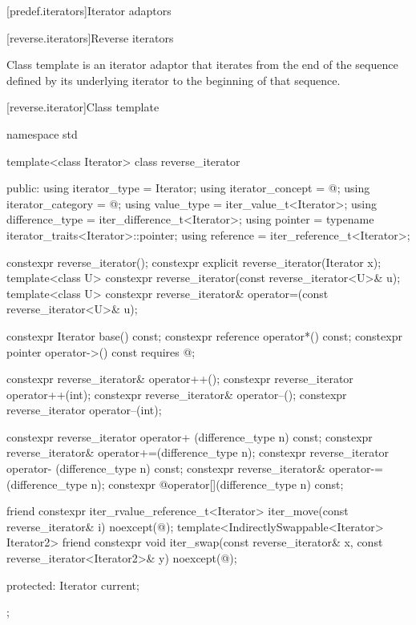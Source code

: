 [predef.iterators]{Iterator adaptors}

[reverse.iterators]{Reverse iterators}

\pnum
Class template  is an iterator adaptor that iterates from the end of the sequence defined by its underlying iterator to the beginning of that sequence.

[reverse.iterator]{Class template }

%
\begin{codeblock}
namespace std {
  template<class Iterator>
  class reverse_iterator {
  public:
    using iterator_type     = Iterator;
    using iterator_concept  = @\seebelow@;
    using iterator_category = @\seebelow@;
    using value_type        = iter_value_t<Iterator>;
    using difference_type   = iter_difference_t<Iterator>;
    using pointer           = typename iterator_traits<Iterator>::pointer;
    using reference         = iter_reference_t<Iterator>;

    constexpr reverse_iterator();
    constexpr explicit reverse_iterator(Iterator x);
    template<class U> constexpr reverse_iterator(const reverse_iterator<U>& u);
    template<class U> constexpr reverse_iterator& operator=(const reverse_iterator<U>& u);

    constexpr Iterator base() const;
    constexpr reference operator*() const;
    constexpr pointer   operator->() const requires @\seebelow@;

    constexpr reverse_iterator& operator++();
    constexpr reverse_iterator  operator++(int);
    constexpr reverse_iterator& operator--();
    constexpr reverse_iterator  operator--(int);

    constexpr reverse_iterator  operator+ (difference_type n) const;
    constexpr reverse_iterator& operator+=(difference_type n);
    constexpr reverse_iterator  operator- (difference_type n) const;
    constexpr reverse_iterator& operator-=(difference_type n);
    constexpr @\unspec@ operator[](difference_type n) const;

    friend constexpr iter_rvalue_reference_t<Iterator>
      iter_move(const reverse_iterator& i) noexcept(@\seebelow@);
    template<IndirectlySwappable<Iterator> Iterator2>
      friend constexpr void
        iter_swap(const reverse_iterator& x,
                  const reverse_iterator<Iterator2>& y) noexcept(@\seebelow@);

  protected:
    Iterator current;
  };
}
\end{codeblock}

